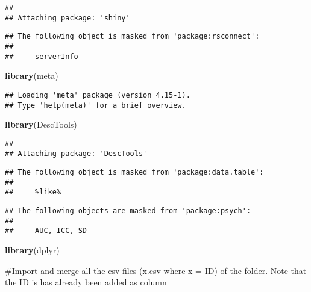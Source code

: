 \documentclass[
]{article}
\newenvironment{Shaded}{\begin{snugshade}}{\end{snugshade}}
\newcommand{\KeywordTok}[1]{\textcolor[rgb]{0.13,0.29,0.53}{\textbf{#1}}}
\newcommand{\NormalTok}[1]{#1}
\begin{document}
\begin{verbatim}
## 
## Attaching package: 'shiny'
\end{verbatim}

\begin{verbatim}
## The following object is masked from 'package:rsconnect':
## 
##     serverInfo
\end{verbatim}

\begin{Shaded}
\begin{Highlighting}[]
\KeywordTok{library}\NormalTok{(meta)}
\end{Highlighting}
\end{Shaded}

\begin{verbatim}
## Loading 'meta' package (version 4.15-1).
## Type 'help(meta)' for a brief overview.
\end{verbatim}

\begin{Shaded}
\begin{Highlighting}[]
\KeywordTok{library}\NormalTok{(DescTools)}
\end{Highlighting}
\end{Shaded}

\begin{verbatim}
## 
## Attaching package: 'DescTools'
\end{verbatim}

\begin{verbatim}
## The following object is masked from 'package:data.table':
## 
##     %like%
\end{verbatim}

\begin{verbatim}
## The following objects are masked from 'package:psych':
## 
##     AUC, ICC, SD
\end{verbatim}

\begin{Shaded}
\begin{Highlighting}[]
\KeywordTok{library}\NormalTok{(dplyr)}
\end{Highlighting}
\end{Shaded}

\#Import and merge all the csv files (x.csv where x = ID) of the folder.
Note that the ID is has already been added as column
\end{document}
